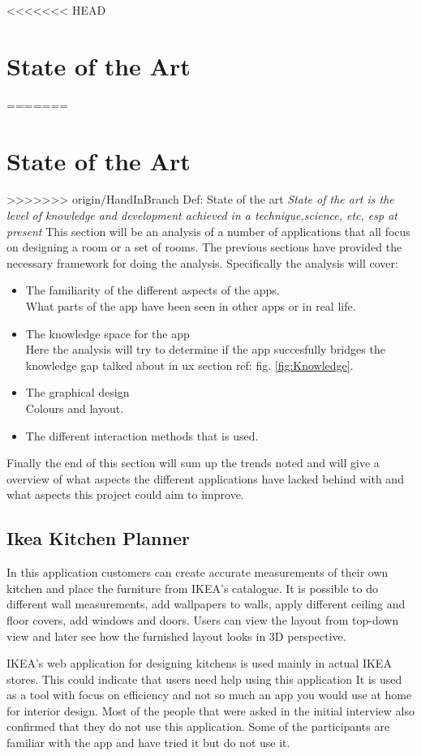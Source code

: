 <<<<<<< HEAD
\section{State of the Art}\label{SOTA}
=======
\section{State of the Art }
\label{Sota}
>>>>>>> origin/HandInBranch
Def: State of the art
\textit{ State of the art is the level of knowledge and development achieved in a technique,science, etc, esp at present }
\newline
This section will be an analysis of a number of applications that all focus on designing a room or a set of rooms. The previous sections have provided the necessary framework for doing the analysis. Specifically the analysis will cover:

\begin{itemize}
\item The familiarity of the different aspects of the apps.\\
What parts of the app have been seen in other apps or in real life. 
\item The knowledge space for the app\\
Here the analysis will try to determine if the app succesfully bridges the knowledge gap talked about in ux section ref: fig. \ref{fig:Knowledge}.
\item The graphical design\\
Colours and layout.
\item The different interaction methods that is used. 
\end{itemize}
 Finally the end of this section will sum up the trends noted and will give a overview of what aspects the different applications have lacked behind with and what aspects this project could aim to improve. 

\subsection{Ikea Kitchen Planner}
In this application customers can create accurate measurements of their own kitchen and place the furniture from IKEA's catalogue. It is possible to do different wall measurements, add wallpapers to walls, apply different ceiling and floor covers, add windows and doors. Users can view the layout from top-down view and later see how the furnished layout looks in 3D perspective.

IKEA's web application for designing kitchens is used mainly in actual IKEA stores. This could indicate that users need help using this application It is used as a tool with focus on efficiency and not so much an app you would use at home for interior design. Most of the people that were asked in the initial interview also confirmed that they do not use this application. Some of the participants are familiar with the app and have tried it but do not use it. 

